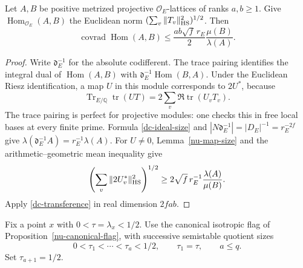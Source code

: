 \begin{lemma}\label{dc-hom-cover}
Let \(A,B\) be positive metrized projective
\(\mathcal O_E\)-lattices of ranks \(a,b\ge1\).
Give \(\operatorname{Hom}_{\mathcal O_E}(A,B)\) the
Euclidean norm
\((\sum_v\|T_v\|_{\rm HS}^2)^{1/2}\).  Then
\begin{equation}\label{dc-hom-cover-bound}
 \operatorname{covrad}\operatorname{Hom}(A,B)
          \le\frac{ab\sqrt f\,r_E}{2}
                                      \frac{\mu(B)}{\lambda(A)}.
\end{equation}
\end{lemma}
\begin{proof}
Write \(\mathfrak d_E^{-1}\) for the absolute
codifferent.  The trace pairing identifies the integral
dual of \(\operatorname{Hom}(A,B)\) with
\(\mathfrak d_E^{-1}\operatorname{Hom}(B,A)\).
Under the Euclidean Riesz identification, a map \(U\)
in this module corresponds to \(2U^*\), because
\[
 \operatorname{Tr}_{E/\mathbb Q}\operatorname{tr}(UT)
                  =2\sum_v\Re\operatorname{tr}(U_vT_v).
\]
The trace pairing is perfect for projective modules:
one checks this in free local bases at every finite
prime.  Formula \eqref{dc-ideal-size} and
\(|N\mathfrak d_E^{-1}|=|D_E|^{-1}=r_E^{-2f}\)
give
\(\lambda(\mathfrak d_E^{-1}A)=r_E^{-1}\lambda(A)\).
For \(U\ne0\), Lemma~\ref{nu-map-size} and the
arithmetic--geometric mean inequality give
\[
 \left(\sum_v\|2U_v^*\|_{\rm HS}^2\right)^{1/2}
       \ge2\sqrt f\,r_E^{-1}\frac{\lambda(A)}{\mu(B)}.
\]
Apply \eqref{dc-transference} in real dimension \(2fab\).
\end{proof}

Fix a point \(x\) with \(0<\tau=\lambda_x<1/2\).
Use the canonical isotropic flag of
Proposition~\ref{nu-canonical-flag}, with successive
semistable quotient sizes
\[
             0<\tau_1<\cdots<\tau_a<1/2,\qquad
             \tau_1=\tau,\qquad a\le q.
\]
Set \(\tau_{a+1}=1/2\).

